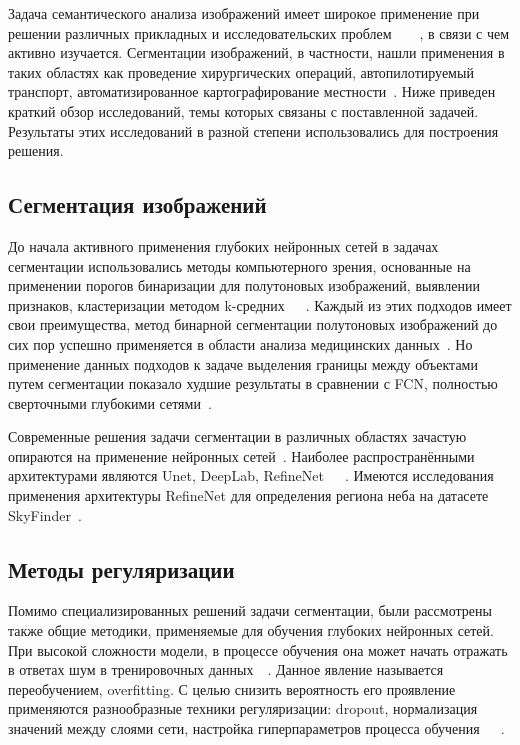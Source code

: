Задача семантического анализа изображений имеет широкое применение при решении различных прикладных и исследовательских
проблем~\autocite{maier2018gentle}~\autocite{pan2019image}~\autocite{stabinger2020evaluating}~\autocite{li2015brief},
в связи с чем активно изучается.
Сегментации изображений, в частности, нашли применения в таких областях как проведение хирургических операций,
автопилотируемый транспорт, автоматизированное картографирование местности~\autocite{liu2018recent}.
Ниже приведен краткий обзор исследований, темы которых связаны с поставленной задачей.
Результаты этих исследований в разной степени использовались для построения решения.

\subsection{Сегментация изображений}

До начала активного применения глубоких нейронных сетей в задачах сегментации использовались методы компьютерного зрения,
основанные на применении порогов бинаризации для полутоновых изображений, выявлении признаков,
кластеризации методом k-средних~\autocite{10.5555/1888028.1888043}~\autocite{10.5555/540298}~\autocite{inproceedings}.
Каждый из этих подходов имеет свои преимущества, метод бинарной сегментации полутоновых изображений до сих пор успешно применяется
в области анализа медицинских данных~\autocite{bookMedicalImages}.
Но применение данных подходов к задаче выделения границы между объектами путем сегментации показало худшие результаты в сравнении с FCN,
полностью сверточными глубокими сетями~\autocite{7966418}.

Современные решения задачи сегментации в различных областях зачастую опираются на применение нейронных сетей~\autocite{feng2019deep}.
Наиболее распространёнными архитектурами являются Unet, DeepLab, RefineNet~\autocite{ronneberger2015unet}~\autocite{chen2016deeplab}~\autocite{lin2016refinenet}.
Имеются исследования применения архитектуры RefineNet для определения региона неба на датасете SkyFinder~\autocite{place2017segmenting}.

\subsection{Методы регуляризации}

Помимо специализированных решений задачи сегментации, были рассмотрены также общие методики, применяемые для обучения глубоких нейронных сетей.
При высокой сложности модели, в процессе обучения она может начать отражать в ответах шум в тренировочных данных~\autocite{salman2019overfitting}~\autocite{ghojogh2019theory}.
Данное явление называется переобучением, overfitting.
С целью снизить вероятность его проявление применяются разнообразные техники регуляризации: dropout, нормализация значений между слоями сети,
настройка гиперпараметров процесса обучения~\autocite{smith2018disciplined}~\autocite{labach2019survey}~\autocite{ioffe2015batch}.

